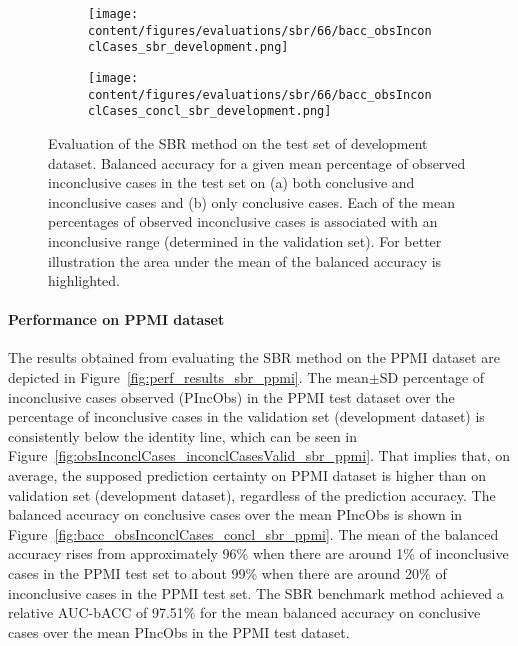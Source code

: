 \begin{figure}[ht]
    \begin{subfigure}{0.5\textwidth}
      \centering
      \texttt{[image: content/figures/evaluations/sbr/66/bacc\_obsInconclCases\_sbr\_development.png]}
      \subcaption{}
      \label{fig:bacc_obsInconclCases_sbr_development}
    \end{subfigure}
    \hfill
    \begin{subfigure}{0.5\textwidth}
      \centering
      \texttt{[image: content/figures/evaluations/sbr/66/bacc\_obsInconclCases\_concl\_sbr\_development.png]}
      \subcaption{}
      \label{fig:bacc_obsInconclCases_concl_sbr_development}
    \end{subfigure}

    \caption{Evaluation of the SBR method on the test set of development dataset.
    Balanced accuracy for a given mean percentage of observed inconclusive cases in the test set on 
    (a) both conclusive and inconclusive cases and (b) only conclusive cases. 
    Each of the mean percentages of observed inconclusive cases is associated with an inconclusive range (determined in the validation set).
    For better illustration the area under the mean of the balanced accuracy is highlighted.}
    \label{fig:bacc_obsInconclCases_sbr_development_full}
\end{figure}




\paragraph{Performance on PPMI dataset}

The results obtained from evaluating the SBR method on the PPMI dataset 
are depicted in Figure~\ref{fig:perf_results_sbr_ppmi}.
The mean$\pm$SD percentage of inconclusive cases observed (PIncObs) in the PPMI test dataset 
over the percentage of inconclusive cases in the validation set (development dataset) 
is consistently below the identity line, 
which can be seen in Figure~\ref{fig:obsInconclCases_inconclCasesValid_sbr_ppmi}.
That implies that, on average, the supposed prediction certainty on PPMI dataset is higher than on validation set (development dataset),
regardless of the prediction accuracy.
The balanced accuracy on conclusive cases over the mean PIncObs is shown 
in Figure~\ref{fig:bacc_obsInconclCases_concl_sbr_ppmi}.
The mean of the balanced accuracy rises from approximately 96\% 
when there are around 1\% of inconclusive cases in the PPMI test set to about 99\% 
when there are around 20\% of inconclusive cases in the PPMI test set.
The SBR benchmark method achieved a relative AUC-bACC of 97.51\% for the mean balanced accuracy on conclusive cases 
over the mean PIncObs in the PPMI test dataset.


